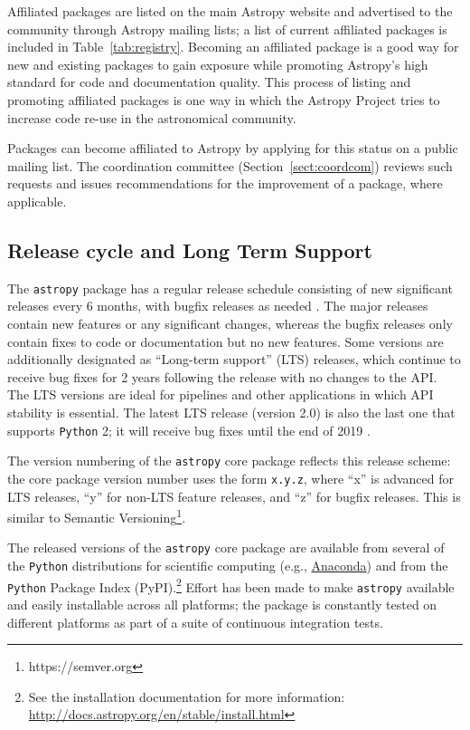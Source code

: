 \documentclass[modern]{aastex62}
\newcommand{\package}[1]{\texttt{#1}\xspace}
\newcommand{\python}{\package{Python}}
\newcommand{\astropy}{Astropy\xspace}
\newcommand{\astropypkg}{\package{astropy}}
\newcommand{\sectionname}{Section\xspace}
\renewcommand{\tablename}{Table\xspace}
\begin{document}
Affiliated packages are listed on the main \astropy website and advertised to
the community through \astropy mailing lists; a list of current affiliated
packages is included in \tablename~\ref{tab:registry}.
Becoming an affiliated package is a good way for new and existing packages to
gain exposure while promoting \astropy's high standard for code and
documentation quality.
This process of listing and promoting affiliated packages is one way in which
the \astropy Project tries to increase code re-use in the astronomical
community.

Packages can become affiliated to \astropy by applying for this status on a public mailing list. The coordination committee (\sectionname~\ref{sect:coordcom}) reviews such requests and issues recommendations for the improvement of a package, where applicable.


\subsection{Release cycle and Long Term Support}
\label{sect:releasecycle}

The \astropypkg package has a regular release schedule consisting of new significant
releases every 6 months, with bugfix releases as needed \citep{ape2}.
The major releases contain new features or any significant changes, whereas
the bugfix releases only contain fixes to code or documentation but no new
features.
Some versions are additionally designated as ``Long-term support'' (LTS)
releases, which continue to receive bug fixes for 2 years following the release
with no changes to the API\@.
The LTS versions are ideal for pipelines and other applications in which API
stability is essential.
The latest LTS release (version 2.0) is also the last one that supports \python
2; it will receive bug fixes until the end of 2019 \citep{ape10}.

The version numbering of the \astropypkg core package reflects this release
scheme: the core package version number uses the form \texttt{x.y.z}, where ``x'' is
advanced for LTS releases, ``y'' for non-LTS feature releases, and
``z'' for bugfix releases.  This is similar to 
Semantic Versioning\footnote{https://semver.org}.

The released versions of the \astropypkg core package are available from several
of the \python distributions for scientific computing (e.g.,
\href{http://anaconda.org}{Anaconda}) and from the \python Package Index
(PyPI).\footnote{See the installation documentation for more information:
\url{http://docs.astropy.org/en/stable/install.html}}
Effort has been made to make \astropypkg available and easily installable across
all platforms; the package is constantly tested on different platforms as part
of a suite of continuous integration tests.
\end{document}
